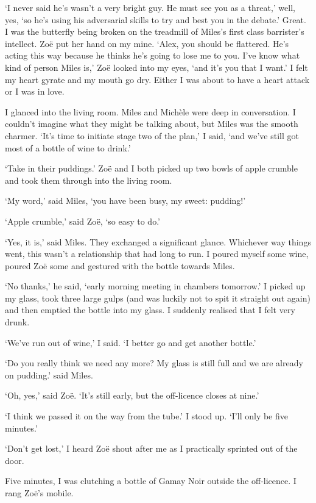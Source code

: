 `I never said he's wasn't a very bright guy. He must see you as a
threat,' well, yes, `so he's using his adversarial skills to try and
best you in the debate.' Great. I was the butterfly being broken on
the treadmill of Miles's first class barrister's intellect. Zoë
put her hand on my mine. `Alex, you should be flattered. He's acting
this way because he thinks he's going to lose me to you. I've know
what kind of person Miles is,' Zoë looked into my eyes, `and
it's you that I want.' I felt my heart gyrate and my mouth go dry.
Either I was about to have a heart attack or I was in love.

I glanced into the living room. Miles and Michèle were deep in
conversation. I couldn't imagine what they might be talking about,
but Miles was the smooth charmer. `It's time to initiate stage two
of the plan,' I said, `and we've still got most of a bottle of wine
to drink.'

`Take in their puddings.' Zoë and I both picked up two bowls of
apple crumble and took them through into the living room.

`My word,' said Miles, `you have been busy, my sweet: pudding!'

`Apple crumble,' said Zoë, `so easy to do.'

`Yes, it is,' said Miles. They exchanged a significant glance.
Whichever way things went, this wasn't a relationship that had long
to run. I poured myself some wine, poured Zoë some and gestured
with the bottle towards Miles.

`No thanks,' he said, `early morning meeting in chambers tomorrow.'
I picked up my glass, took three large gulps (and was luckily not to
spit it straight out again) and then emptied the bottle into my
glass. I suddenly realised that I felt very drunk.

`We've run out of wine,' I said. `I better go and get another
bottle.'

`Do you really think we need any more? My glass is still full and we
are already on pudding.' said Miles.

`Oh, yes,' said Zoë. `It's still early, but the off-licence
closes at nine.'

`I think we passed it on the way from the tube.' I stood up. `I'll only
be five minutes.'

`Don't get lost,' I heard Zoë shout after me as I practically
sprinted out of the door.

Five minutes, I was clutching a bottle of Gamay Noir outside the
off-licence. I rang Zoë's mobile.

